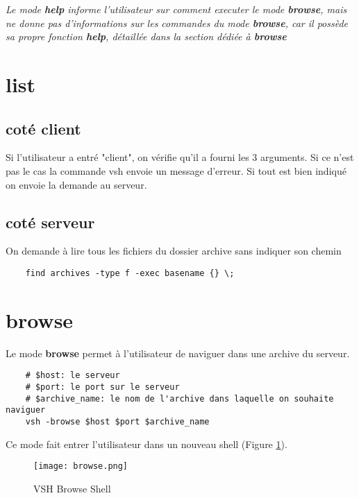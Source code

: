 \documentclass[titlepage]{article}
\begin{document}
	\textit{Le mode \textbf{help} informe l'utilisateur sur comment executer le mode \textbf{browse}, mais ne donne pas d'informations sur les commandes du mode \textbf{browse}, car il possède sa propre fonction \textbf{help}, détaillée dans la section dédiée à \textbf{browse}}

	\section{list}

	\subsection{coté client}

	Si l'utilisateur a entré "client", on vérifie qu'il a fourni les 3 arguments. Si ce n'est pas le cas la commande vsh envoie un message d'erreur. Si tout est bien indiqué on envoie la demande au serveur.

	\subsection{coté serveur}

	On demande à lire tous les fichiers du dossier archive sans indiquer son chemin	

	\begin{lstlisting}
	find archives -type f -exec basename {} \;
	\end{lstlisting}

	\section{browse}

	Le mode \textbf{browse} permet à l'utilisateur de naviguer dans une archive du serveur.

	\begin{lstlisting}
	# $host: le serveur
	# $port: le port sur le serveur
	# $archive_name: le nom de l'archive dans laquelle on souhaite naviguer
	vsh -browse $host $port $archive_name
	\end{lstlisting}

	Ce mode fait entrer l'utilisateur dans un nouveau shell (Figure \ref{fig:browse}).

	\begin{figure}
  	\texttt{[image: browse.png]}
  	\caption{VSH Browse Shell}
  	\label{fig:browse}
	\end{figure}
\end{document}
